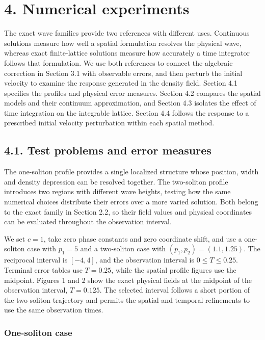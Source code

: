 \documentclass[11pt,a4paper]{article}
\begin{document}
\FloatBarrier
\section*{4. Numerical experiments}

The exact wave families provide two references with different uses. Continuous solutions measure how well a spatial formulation resolves the physical wave, whereas exact finite-lattice solutions measure how accurately a time integrator follows that formulation. We use both references to connect the algebraic correction in Section 3.1 with observable errors, and then perturb the initial velocity to examine the response generated in the density field. Section 4.1 specifies the profiles and physical error measures. Section 4.2 compares the spatial models and their continuum approximation, and Section 4.3 isolates the effect of time integration on the integrable lattice. Section 4.4 follows the response to a prescribed initial velocity perturbation within each spatial method.

\FloatBarrier
\subsection*{4.1. Test problems and error measures}

The one-soliton profile provides a single localized structure whose position, width and density depression can be resolved together. The two-soliton profile introduces two regions with different wave heights, testing how the same numerical choices distribute their errors over a more varied solution. Both belong to the exact family in Section 2.2, so their field values and physical coordinates can be evaluated throughout the observation interval.

We set \(c=1\), take zero phase constants and zero coordinate shift, and use a one-soliton case with \(p_1=5\) and a two-soliton case with \((p_1,p_2)=(1.1,1.25)\). The reciprocal interval is \([-4,4]\), and the observation interval is \(0\leq T\leq0.25\). Terminal error tables use \(T=0.25\), while the spatial profile figures use the midpoint. Figures 1 and 2 show the exact physical fields at the midpoint of the observation interval, \(T=0.125\). The selected interval follows a short portion of the two-soliton trajectory and permits the spatial and temporal refinements to use the same observation times.

\subsubsection*{One-soliton case}
\end{document}
